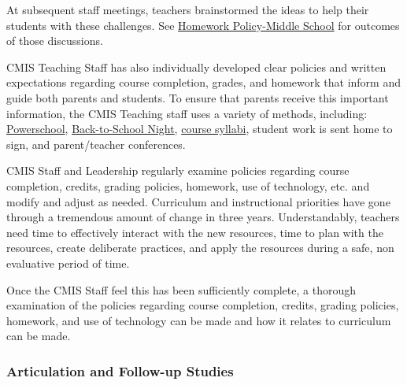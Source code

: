 \begin{findings}
At subsequent staff meetings, teachers brainstormed the ideas to help their students with these challenges. See \href{https://docs.google.com/a/cmis.ac.th/document/d/16b9QZYYXoRK-nJdFtCsW13NB9IwzAu8rlmTMnJ6usdo/edit?usp=sharing}{Homework Policy-Middle School} for outcomes of those discussions. 


CMIS Teaching Staff has also individually developed clear policies and written expectations regarding course completion, grades, and homework that inform and guide both parents and students. To ensure that parents receive this important information, the CMIS Teaching staff uses a variety of methods, including: \href{https://cmis.powerschool.com/teachers/pw.html}{Powerschool}, \href{https://drive.google.com/drive/folders/0B0TYmzaZNi3fZTFCbmEtZzdVZnM?usp=sharing}{Back-to-School Night}, \href{https://drive.google.com/drive/folders/0ByVFfrm0zfolNmdnMzU2S2xRSWs?usp=sharing}{course syllabi}, student work is sent home to sign, and parent/teacher conferences. 


CMIS Staff and Leadership regularly examine policies regarding course completion, credits, grading policies, homework, use of technology, etc. and modify and adjust as needed. Curriculum and instructional priorities have gone through a tremendous amount of change in three years. Understandably, teachers need time to effectively interact with the new resources, time to plan with the resources, create deliberate practices, and apply the resources during a safe, non evaluative period of time. 

Once the CMIS Staff feel this has been sufficiently complete, a thorough examination of the policies regarding course completion, credits, grading policies, homework, and use of technology can be made and how it relates to curriculum can be made. 
\end{findings}

\subsubsection{Articulation and Follow-up Studies}



